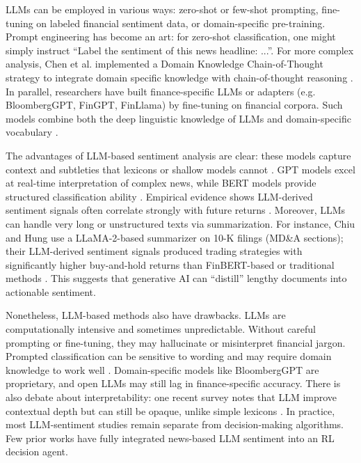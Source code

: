 \gls{LLM}s can be employed in various ways: zero-shot or few-shot prompting, fine-tuning on labeled financial sentiment data, or domain-specific pre-training. Prompt engineering has become an art: for zero-shot classification, one might simply instruct “Label the sentiment of this news headline: ...”. For more complex analysis, Chen et al. implemented a Domain Knowledge Chain-of-Thought strategy to integrate domain specific knowledge with chain-of-thought reasoning \cite{Chen2025}. In parallel, researchers have built finance-specific \gls{LLM}s or adapters (e.g. BloombergGPT, FinGPT, FinLlama) by fine-tuning on financial corpora. Such models combine both the deep linguistic knowledge of \gls{LLM}s and domain-specific vocabulary \cite{Nie2024}.

The advantages of \gls{LLM}-based sentiment analysis are clear: these models capture context and subtleties that lexicons or shallow models cannot \cite{LiuArulappan2024, Kirtac2024}. \gls{GPT} models excel at real-time interpretation of complex news, while \gls{BERT} models provide structured classification ability \cite{LiuArulappan2024}. Empirical evidence shows \gls{LLM}-derived sentiment signals often correlate strongly with future returns \cite{Fatouros2023, Kirtac2024}. Moreover, \gls{LLM}s can handle very long or unstructured texts via summarization. For instance, Chiu and Hung use a LLaMA-2-based summarizer on 10-K filings (MD\&A sections); their \gls{LLM}-derived sentiment signals produced trading strategies with significantly higher buy-and-hold returns than FinBERT-based or traditional methods \cite{Chiu2024}. This suggests that generative AI can “distill” lengthy documents into actionable sentiment.

Nonetheless, \gls{LLM}-based methods also have drawbacks. \gls{LLM}s are computationally intensive and sometimes unpredictable. Without careful prompting or fine-tuning, they may hallucinate or misinterpret financial jargon. Prompted classification can be sensitive to wording and may require domain knowledge to work well \cite{Chen2025}. Domain-specific models like BloombergGPT are proprietary, and open LLMs may still lag in finance-specific accuracy. There is also debate about interpretability: one recent survey notes that \gls{LLM} improve contextual depth but can still be opaque, unlike simple lexicons \cite{Kirtac2024}. In practice, most \gls{LLM}-sentiment studies remain separate from decision-making algorithms. Few prior works have fully integrated news-based \gls{LLM} sentiment into an \gls{RL} decision agent.

